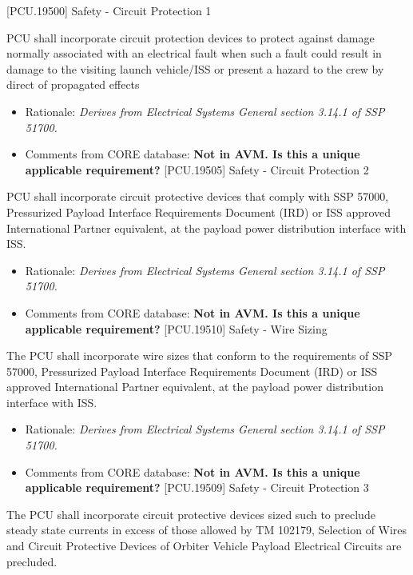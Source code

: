 [PCU.19500] Safety - Circuit Protection 1

PCU shall incorporate circuit protection devices to protect against damage normally associated with an electrical fault when such a fault could result in damage to the visiting launch vehicle\slash ISS or present a hazard to the crew by direct of propagated effects

\begin{itemize}
\item{} Rationale: \emph{Derives from Electrical Systems General section 3.14.1 of SSP 51700.}

\item{} Comments from CORE database: \textbf{Not in AVM. Is this a unique applicable requirement?}
[PCU.19505] Safety - Circuit Protection 2

\end{itemize}

PCU shall incorporate circuit protective devices that comply with SSP 57000, Pressurized Payload Interface Requirements Document (IRD) or ISS approved International Partner equivalent, at the payload power distribution interface with ISS.

\begin{itemize}
\item{} Rationale: \emph{Derives from Electrical Systems General section 3.14.1 of SSP 51700.}

\item{} Comments from CORE database: \textbf{Not in AVM. Is this a unique applicable requirement?}
[PCU.19510] Safety - Wire Sizing

\end{itemize}

The PCU shall incorporate wire sizes that conform to the requirements of SSP 57000, Pressurized Payload Interface Requirements Document (IRD) or ISS approved International Partner equivalent, at the payload power distribution interface with ISS.

\begin{itemize}
\item{} Rationale: \emph{Derives from Electrical Systems General section 3.14.1 of SSP 51700.}

\item{} Comments from CORE database: \textbf{Not in AVM. Is this a unique applicable requirement?}
[PCU.19509] Safety - Circuit Protection 3

\end{itemize}

The PCU shall incorporate circuit protective devices sized such to preclude steady state currents in excess of those allowed by TM 102179, Selection of Wires and Circuit Protective Devices of Orbiter Vehicle Payload Electrical Circuits are precluded.

